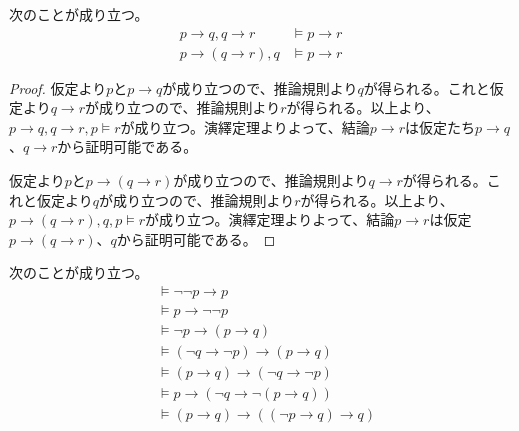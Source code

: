 \documentclass[a4paper]{jsarticle}
\begin{document}
\begin{thm}
\label{1.1.1.3}
次のことが成り立つ。
\begin{align*}
p \rightarrow q,q \rightarrow r &\vDash p \rightarrow r \\
p \rightarrow (q \rightarrow r),q &\vDash p \rightarrow r
\end{align*}
\end{thm}
\begin{proof}
仮定より$p$と$p \rightarrow q$が成り立つので、推論規則より$q$が得られる。これと仮定より$q \rightarrow r$が成り立つので、推論規則より$r$が得られる。以上より、$p \rightarrow q,q \rightarrow r,p \vDash r$が成り立つ。演繹定理よりよって、結論$p \rightarrow r$は仮定たち$p \rightarrow q$、$q \rightarrow r$から証明可能である。\par
仮定より$p$と$p \rightarrow (q \rightarrow r)$が成り立つので、推論規則より$q \rightarrow r$が得られる。これと仮定より$q$が成り立つので、推論規則より$r$が得られる。以上より、$p \rightarrow (q \rightarrow r),q,p \vDash r$が成り立つ。演繹定理よりよって、結論$p \rightarrow r$は仮定$p \rightarrow (q \rightarrow r)$、$q$から証明可能である。
\end{proof}
\begin{thm}
\label{1.1.1.4}
次のことが成り立つ。
\begin{align*}
&\vDash \neg\neg p \rightarrow p \\
&\vDash p \rightarrow \neg\neg p \\
&\vDash \neg p \rightarrow (p \rightarrow q) \\
&\vDash (\neg q \rightarrow \neg p) \rightarrow (p \rightarrow q) \\
&\vDash (p \rightarrow q) \rightarrow (\neg q \rightarrow \neg p) \\
&\vDash p \rightarrow \left( \neg q \rightarrow \neg(p \rightarrow q) \right) \\
&\vDash (p \rightarrow q) \rightarrow \left( (\neg p \rightarrow q) \rightarrow q \right) 
\end{align*}
\end{thm}
\end{document}
